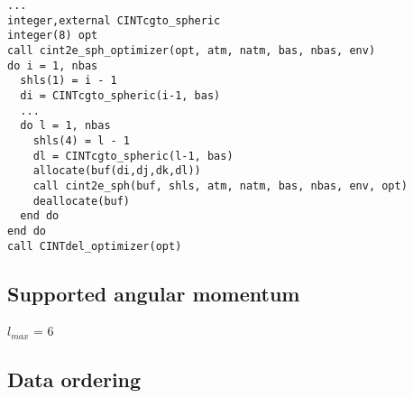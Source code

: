 \documentclass[]{article}
\begin{document}
\begin{verbatim}
...
integer,external CINTcgto_spheric
integer(8) opt
call cint2e_sph_optimizer(opt, atm, natm, bas, nbas, env)
do i = 1, nbas
  shls(1) = i - 1
  di = CINTcgto_spheric(i-1, bas)
  ...
  do l = 1, nbas
    shls(4) = l - 1
    dl = CINTcgto_spheric(l-1, bas)
    allocate(buf(di,dj,dk,dl))
    call cint2e_sph(buf, shls, atm, natm, bas, nbas, env, opt)
    deallocate(buf)
  end do
end do
call CINTdel_optimizer(opt)
\end{verbatim}

\subsection{Supported angular
momentum}\label{supported-angular-momentum}

$l_{max}$ = 6

\subsection{Data ordering}\label{data-ordering}
\end{document}
